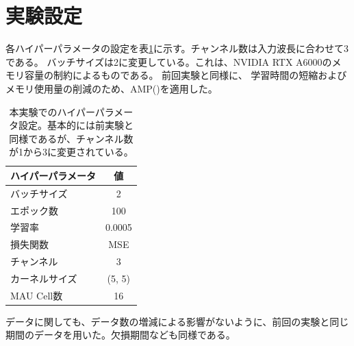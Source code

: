   \section{実験設定}
    各ハイパーパラメータの設定を表\ref{tab:exp2_hyperparameters}に示す。チャンネル数は入力波長に合わせて3である。
    バッチサイズは2に変更している。これは、NVIDIA RTX A6000のメモリ容量の制約によるものである。
    前回実験と同様に、 学習時間の短縮およびメモリ使用量の削減のため、AMP(\cite{micikevicius2017mixed})を適用した。
    \begin{table}[htbp]
      \centering
      \begin{tabular}{lc}
      \hline
      ハイパーパラメータ & 値 \\
      \hline\hline
      バッチサイズ & 2 \\
      \hline
      エポック数 & 100 \\
      \hline
      学習率 & 0.0005 \\
      \hline
      損失関数 & MSE \\
      \hline
      チャンネル & 3 \\
      \hline
      カーネルサイズ & (5, 5) \\
      \hline
      MAU Cell数 & 16 \\
      \hline
      \end{tabular}
      \caption{本実験でのハイパーパラメータ設定。基本的には前実験と同様であるが、チャンネル数が1から3に変更されている。}
      \label{tab:exp2_hyperparameters}
    \end{table}
    データに関しても、データ数の増減による影響がないように、前回の実験と同じ期間のデータを用いた。欠損期間なども同様である。


